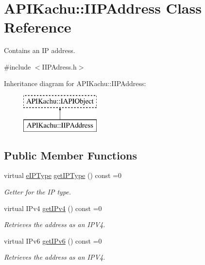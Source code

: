 \hypertarget{class_a_p_i_kachu_1_1_i_i_p_address}{}\section{A\+P\+I\+Kachu\+:\+:I\+I\+P\+Address Class Reference}
\label{class_a_p_i_kachu_1_1_i_i_p_address}


Contains an IP address.  




{\ttfamily \#include $<$I\+I\+P\+Adress.\+h$>$}

Inheritance diagram for A\+P\+I\+Kachu\+:\+:I\+I\+P\+Address\+:\begin{figure}[H]
\begin{center}
\leavevmode
\includegraphics[height=2.000000cm]{class_a_p_i_kachu_1_1_i_i_p_address}
\end{center}
\end{figure}
\subsection*{Public Member Functions}
\begin{DoxyCompactItemize}
\item 
virtual \hyperlink{namespace_a_p_i_kachu_a598aa0dea3ecfb9e34910b0afe82fa84}{e\+I\+P\+Type} \hyperlink{class_a_p_i_kachu_1_1_i_i_p_address_a429dee9188b9fb101841e916642ae980}{get\+I\+P\+Type} () const  =0
\begin{DoxyCompactList}\small\item\em Getter for the IP type. \end{DoxyCompactList}\item 
virtual I\+Pv4 \hyperlink{class_a_p_i_kachu_1_1_i_i_p_address_affb964a8c3ea6195dede102472ee91f7}{get\+I\+Pv4} () const  =0
\begin{DoxyCompactList}\small\item\em Retrieves the address as an I\+P\+V4. \end{DoxyCompactList}\item 
virtual I\+Pv6 \hyperlink{class_a_p_i_kachu_1_1_i_i_p_address_a1e36e9df1233d280c7043d52a674bc82}{get\+I\+Pv6} () const  =0
\begin{DoxyCompactList}\small\item\em Retrieves the address as an I\+P\+V4. \end{DoxyCompactList}\end{DoxyCompactItemize}


